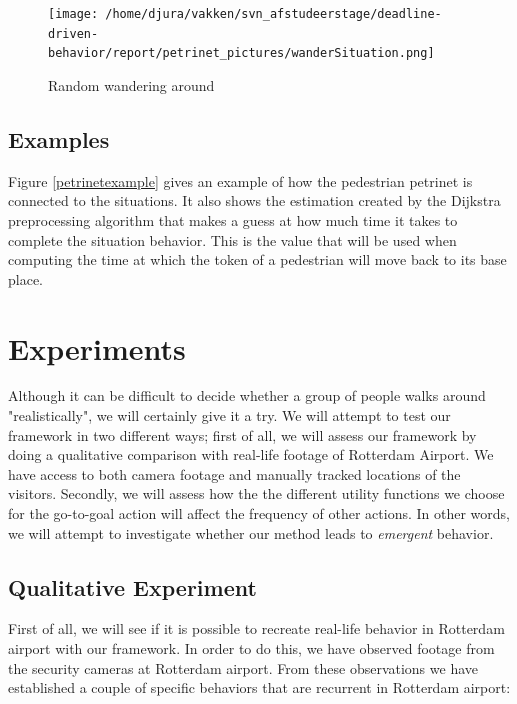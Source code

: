 \documentclass[11pt]{book}
\begin{document}
\begin{figure}
\centering            
\texttt{[image: /home/djura/vakken/svn\_afstudeerstage/deadline-driven-behavior/report/petrinet\_pictures/wanderSituation.png]}
\caption{Random wandering around}
\label{fig:wanderpetrinet}
\end{figure}

\section{Examples}
Figure \ref{petrinetexample} gives an example of how the pedestrian petrinet is connected to the situations. It also shows the estimation created by the Dijkstra preprocessing algorithm that makes a guess at how much time it takes to complete the situation behavior. This is the value that will be used when computing the time at which the token of a pedestrian will move back to its base place.


\chapter{Experiments}
\label{chap:experiments}
Although it can be difficult to decide whether a group of people walks around "realistically", we will certainly give it a try. We will attempt to test our framework in two different ways; first of all, we will assess our framework by doing a qualitative comparison with real-life footage of Rotterdam Airport. We have access to both camera footage and manually tracked locations of the visitors.
Secondly, we will assess how the the different utility functions we choose for the go-to-goal action will affect the frequency of other actions. In other words, we will attempt to investigate whether our method leads to \emph{emergent} behavior.


\section{Qualitative Experiment}
First of all, we will see if it is possible to recreate real-life behavior in Rotterdam airport with our framework. In order to do this, we have observed footage from the security cameras at Rotterdam airport. From these observations we have established a couple of specific behaviors that are recurrent in Rotterdam airport:
\end{document}
